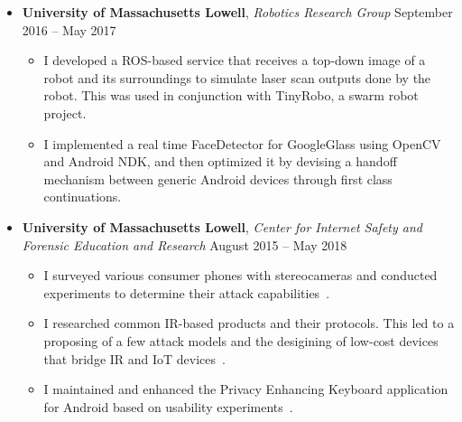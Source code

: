 \documentclass[11pt]{article}
\begin{document}
\begin{itemize}[leftmargin=*]
\begin{itemize}
    \end{itemize}
  \item \textbf{University of Massachusetts Lowell}, \emph{Robotics Research Group} September 2016 -- May 2017
    \begin{itemize}
      \item I developed a ROS-based service that receives a top-down image of a robot and its surroundings to simulate laser scan outputs done by the robot. This was used in conjunction with TinyRobo, a swarm robot project.
      \item I implemented a real time FaceDetector for GoogleGlass using OpenCV and Android NDK, and then optimized it by devising a handoff mechanism between generic Android devices through first class continuations.
    \end{itemize}
  \item \textbf{University of Massachusetts Lowell}, \emph{Center for Internet Safety and Forensic Education and Research} August 2015 -- May 2018
    \begin{itemize}
      \item I surveyed various consumer phones with stereocameras and conducted experiments to determine their attack capabilities~\cite{Li17icc}.
      \item I researched common IR-based products and their protocols. This led to a proposing of a few attack models and the desigining of low-cost devices that bridge IR and IoT devices~\cite{Sano18wasa}.
      \item I maintained and enhanced the Privacy Enhancing Keyboard application for Android based on usability experiments~\cite{Ling17wasa, Ling17wcmc}.
    \end{itemize}
\end{itemize}
\end{document}
